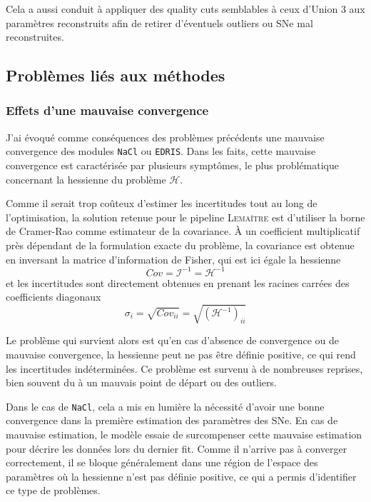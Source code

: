 \documentclass{book}
\def\lemaitre{\textsc{Lemaître}\xspace}
\def\nacl{\texttt{NaCl}\xspace}
\def\edris{\texttt{EDRIS}\xspace}
\let\mcl\mathcal
\begin{document}
Cela a aussi conduit à appliquer des quality cuts semblables à ceux d'Union 3 aux paramètres reconstruits afin de retirer d'éventuels outliers ou SNe mal reconstruites.

\subsection{Problèmes liés aux méthodes}

\subsubsection{Effets d'une mauvaise convergence }

J'ai évoqué comme conséquences des problèmes précédents une mauvaise convergence des modules \nacl ou \edris. Dans les faits, cette mauvaise convergence est caractérisée par plusieurs symptômes, le plus problématique concernant la hessienne du problème $\mcl H$.

Comme il serait trop coûteux d'estimer les incertitudes tout au long de l'optimisation, la solution retenue pour le pipeline \lemaitre est d'utiliser la borne de Cramer-Rao comme estimateur de la covariance. À un coefficient multiplicatif près dépendant de la formulation exacte du problème, la covariance est obtenue en inversant la matrice d'information de Fisher, qui est ici égale la hessienne 
\begin{equation}
	Cov = \mcl I^{-1} = \mcl H^{-1}
\end{equation}
et les incertitudes sont directement obtenues en prenant les racines carrées des coefficients diagonaux
\begin{equation}
	\sigma_i = \sqrt{Cov_{ii}} = \sqrt{(\mcl H^{-1})_{ii}}
\end{equation}

Le problème qui survient alors est qu'en cas d'absence de convergence ou de mauvaise convergence, la hessienne peut ne pas être définie positive, ce qui rend les incertitudes indéterminées. Ce problème est survenu à de nombreuses reprises, bien souvent du à un mauvais point de départ ou des outliers.

Dans le cas de \nacl, cela a mis en lumière la nécessité d'avoir une bonne convergence dans la première estimation des paramètres des SNe. En cas de mauvaise estimation, le modèle essaie de surcompenser cette mauvaise estimation pour décrire les données lors du dernier fit. Comme il n'arrive pas à converger correctement, il se bloque généralement dans une région de l'espace des paramètres où la hessienne n'est pas définie positive, ce qui a permis d'identifier ce type de problèmes.
\end{document}
